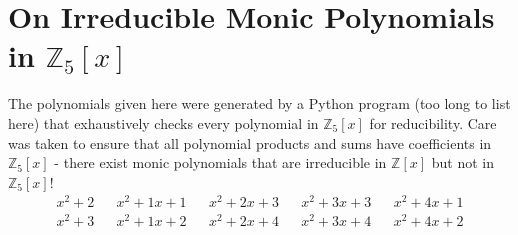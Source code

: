 \documentclass[12pt]{article}
\newcommand*{\Z}{\mathbb{Z}}
\begin{document}
\section{On Irreducible Monic Polynomials in $\Z_5[x]$}
The polynomials given here were generated by a Python program (too long to list here) that exhaustively checks every polynomial in $\Z_5[x]$ for reducibility. Care was taken to ensure that all polynomial products and sums have coefficients in $\Z_5[x]$ - there exist monic polynomials that are irreducible in $\Z[x]$ but not in $\Z_5[x]$!
\begin{align*}
x^2+ 2 && x^2+ 1x+ 1 && x^2+ 2x+ 3 && x^2+ 3x+ 3 && x^2+ 4x+ 1\\
x^2+ 3 && x^2+ 1x+ 2 && x^2+ 2x+ 4 && x^2+ 3x+ 4 && x^2+ 4x+ 2
\end{align*}
\end{document}
